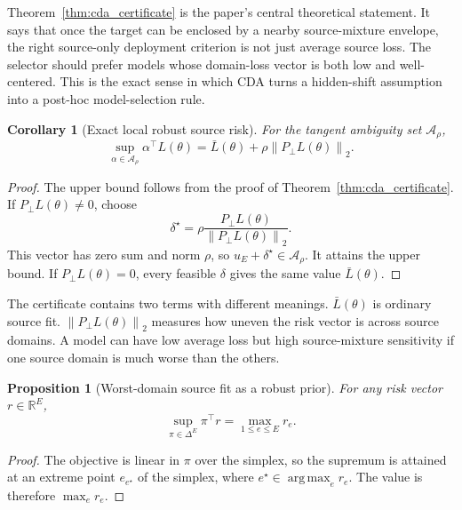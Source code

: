 \documentclass{article}
\newtheorem{proposition}[theorem]{Proposition}
\newtheorem{corollary}[theorem]{Corollary}
\theoremstyle{definition}
\newcommand{\RR}{\mathbb{R}}
\newcommand{\cA}{\mathcal{A}}
\newcommand{\argmax}{\operatorname*{arg\,max}}
\newcommand{\simplex}{\Delta}
\newcommand{\norm}[1]{\left\lVert #1 \right\rVert}
\newcommand{\ub}{u_E}
\begin{document}
Theorem~\ref{thm:cda_certificate} is the paper's central theoretical statement. It says that once the target can be enclosed by a nearby source-mixture envelope, the right source-only deployment criterion is not just average source loss. The selector should prefer models whose domain-loss vector is both low and well-centered. This is the exact sense in which CDA turns a hidden-shift assumption into a post-hoc model-selection rule.

\begin{corollary}[Exact local robust source risk]
\label{cor:exact_robust}
For the tangent ambiguity set \(\cA_\rho\),
\begin{equation}
\sup_{\alpha\in\cA_\rho}\alpha^\top L(\theta)
=
\bar L(\theta)+\rho\norm{P_\perp L(\theta)}_2.
\label{eq:exact_robust}
\end{equation}
\end{corollary}

\begin{proof}
The upper bound follows from the proof of Theorem~\ref{thm:cda_certificate}. If \(P_\perp L(\theta)\neq 0\), choose
\[
\delta^\star=\rho\frac{P_\perp L(\theta)}{\norm{P_\perp L(\theta)}_2}.
\]
This vector has zero sum and norm \(\rho\), so \(\ub+\delta^\star\in\cA_\rho\). It attains the upper bound. If \(P_\perp L(\theta)=0\), every feasible \(\delta\) gives the same value \(\bar L(\theta)\).
\end{proof}

The certificate contains two terms with different meanings. \(\bar L(\theta)\) is ordinary source fit. \(\norm{P_\perp L(\theta)}_2\) measures how uneven the risk vector is across source domains. A model can have low average loss but high source-mixture sensitivity if one source domain is much worse than the others.

\begin{proposition}[Worst-domain source fit as a robust prior]
\label{prop:worst_domain_prior}
For any risk vector \(r\in\RR^E\),
\begin{equation}
\sup_{\pi\in\simplex^E}\pi^\top r=\max_{1\le e\le E} r_e.
\label{eq:worst_domain_prior}
\end{equation}
\end{proposition}

\begin{proof}
The objective is linear in \(\pi\) over the simplex, so the supremum is attained at an extreme point \(e_{e^\star}\) of the simplex, where \(e^\star\in\argmax_e r_e\). The value is therefore \(\max_e r_e\).
\end{proof}
\end{document}
